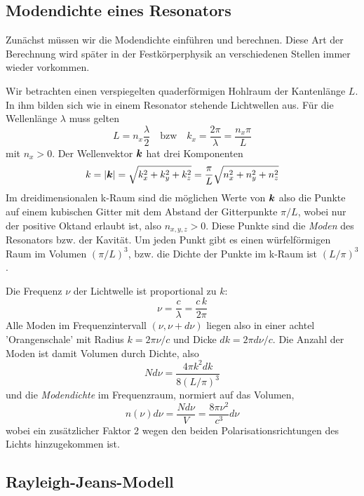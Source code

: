 \subsection{Modendichte eines Resonators}

Zunächst müssen wir die Modendichte einführen und berechnen. Diese Art der Berechnung wird später in der Festkörperphysik an verschiedenen Stellen immer wieder vorkommen.

Wir betrachten einen verspiegelten quaderförmigen Hohlraum der Kantenlänge $L$. In ihm bilden sich wie in einem Resonator stehende Lichtwellen aus. Für die Wellenlänge $\lambda$ muss gelten
\begin{equation}
     L = n_x \frac{\lambda}{2} \quad \text{bzw} \quad k_x = \frac{2 \pi}{\lambda} = \frac{n_x \pi }{L}
\end{equation}
mit $n_x > 0$. Der Wellenvektor $\boldsymbol{k}$ hat drei Komponenten
\begin{equation}
    k = | \boldsymbol{k} | = \sqrt{k_x^2 + k_y^2 + k_z^2 } = \frac{\pi}{L} \sqrt{n_x^2 + n_y^2 + n_z^2}
\end{equation}
Im dreidimensionalen k-Raum sind die möglichen Werte von $\boldsymbol{k}$ also die Punkte auf einem kubischen Gitter mit dem Abstand der Gitterpunkte $\pi / L$, wobei nur der positive Oktand erlaubt ist, also $n_{x,y,z} > 0$. Diese Punkte sind die \emph{Moden} des Resonators bzw. der Kavität. Um jeden Punkt gibt es einen würfelförmigen Raum im Volumen $(\pi/L)^3$, bzw. die Dichte der Punkte im k-Raum ist $(L/\pi)^3$.

Die Frequenz $\nu$ der Lichtwelle ist proportional zu $k$:
\begin{equation}
    \nu = \frac{c}{\lambda} = \frac{c \, k}{2 \pi }
\end{equation}
Alle Moden  im  Frequenzintervall $(\nu, \nu+d\nu)$ liegen also in einer  achtel 'Orangenschale' mit Radius $k = 2 \pi \nu / c$  und Dicke $dk = 2 \pi d\nu / c$. Die Anzahl der Moden ist damit Volumen durch Dichte, also  
\begin{equation}
    N d\nu = \frac{4 \pi k^2 dk}{8 (L/\pi)^3} 
\end{equation}
und die \emph{Modendichte} im Frequenzraum, normiert auf das Volumen,
\begin{equation}
    n(\nu) d\nu = \frac{N d\nu}{V} = \frac{8 \pi \nu^2}{c^3} d\nu
\end{equation}
wobei ein zusätzlicher Faktor 2 wegen den beiden Polarisationsrichtungen des Lichts hinzugekommen ist.


\subsection{Rayleigh-Jeans-Modell}

